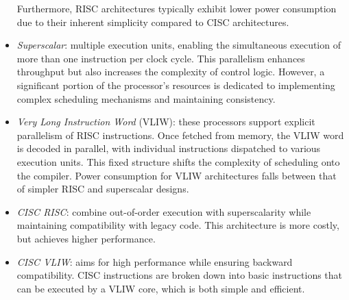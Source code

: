 \begin{itemize}
        Furthermore, RISC architectures typically exhibit lower power consumption due to their inherent simplicity compared to CISC architectures.
    \item \textit{Superscalar}: multiple execution units, enabling the simultaneous execution of more than one instruction per clock cycle. 
        This parallelism enhances throughput but also increases the complexity of control logic. 
        However, a significant portion of the processor's resources is dedicated to implementing complex scheduling mechanisms and maintaining consistency.
    \item \textit{Very Long Instruction Word} (VLIW): these processors support explicit parallelism of RISC instructions. 
        Once fetched from memory, the VLIW word is decoded in parallel, with individual instructions dispatched to various execution units. 
        This fixed structure shifts the complexity of scheduling onto the compiler.
        Power consumption for VLIW architectures falls between that of simpler RISC and superscalar designs. 
    \item \textit{CISC RISC}: combine out-of-order execution with superscalarity while maintaining compatibility with legacy code. 
        This architecture is more costly, but achieves higher performance. 
    \item \textit{CISC VLIW}: aims for high performance while ensuring backward compatibility. 
        CISC instructions are broken down into basic instructions that can be executed by a VLIW core, which is both simple and efficient.
\end{itemize}

